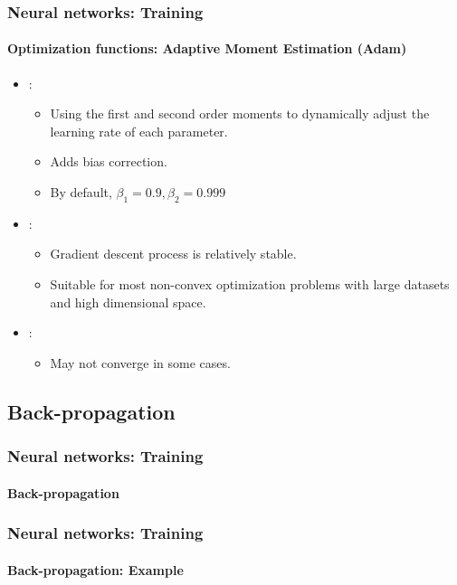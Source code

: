 \documentclass[xcolor=table]{beamer}
\begin{document}
\begin{frame}
	\frametitle{Neural networks: Training}
	\framesubtitle{Optimization functions: Adaptive Moment Estimation (Adam)}

\begin{itemize}
	\item {}: 
	\begin{itemize}
		\item Using the first and second order moments to dynamically adjust the learning rate of each parameter.
		\item Adds bias correction.
		\item By default, $\beta_1 = 0.9, \beta_2 = 0.999$ 
	\end{itemize}
	\item {}: 
	\begin{itemize}
		\item Gradient descent process is relatively stable.
		\item Suitable for most non-convex optimization problems with large datasets and high dimensional space.
	\end{itemize}
	\item {}: 
	\begin{itemize}
		\item May not converge in some cases.
	\end{itemize}
\end{itemize}

\end{frame}

\subsection{Back-propagation}

\begin{frame}
	\frametitle{Neural networks: Training}
	\framesubtitle{Back-propagation}
	
	
\end{frame}

\begin{frame}
	\frametitle{Neural networks: Training}
	\framesubtitle{Back-propagation: Example}
	
	
\end{frame}
\end{document}
